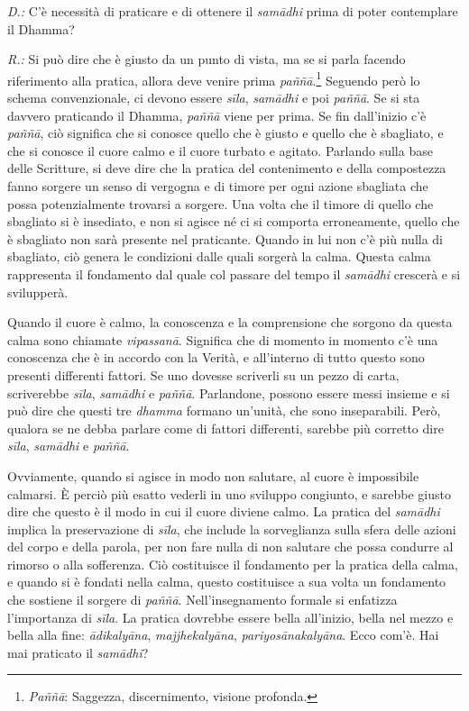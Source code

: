 \emph{D.:} C'è necessità di praticare e di ottenere il \emph{samādhi} prima di
poter contemplare il Dhamma?

\emph{R.:} Si può dire che è giusto da un punto di vista, ma se si parla
facendo riferimento alla pratica, allora deve venire prima
\emph{paññā}.\footnote{\emph{Paññā}: Saggezza, discernimento, visione
  profonda.} Seguendo però lo schema convenzionale, ci devono essere
\emph{sīla}, \emph{samādhi} e poi \emph{paññā}. Se si sta davvero
praticando il Dhamma, \emph{paññā} viene per prima. Se fin dall'inizio
c'è \emph{paññā}, ciò significa che si conosce quello che è giusto e
quello che è sbagliato, e che si conosce il cuore calmo e il cuore
turbato e agitato. Parlando sulla base delle Scritture, si deve dire che
la pratica del contenimento e della compostezza fanno sorgere un senso
di vergogna e di timore per ogni azione sbagliata che possa
potenzialmente trovarsi a sorgere. Una volta che il timore di quello che
sbagliato si è insediato, e non si agisce né ci si comporta
erroneamente, quello che è sbagliato non sarà presente nel praticante.
Quando in lui non c'è più nulla di sbagliato, ciò genera le condizioni
dalle quali sorgerà la calma. Questa calma rappresenta il fondamento dal
quale col passare del tempo il \emph{samādhi} crescerà e si svilupperà.

Quando il cuore è calmo, la conoscenza e la comprensione che sorgono da
questa calma sono chiamate \emph{vipassanā}. Significa che di momento in
momento c'è una conoscenza che è in accordo con la Verità, e all'interno
di tutto questo sono presenti differenti fattori. Se uno dovesse
scriverli su un pezzo di carta, scriverebbe \emph{sīla}, \emph{samādhi}
e \emph{paññā}. Parlandone, possono essere messi insieme e si può dire
che questi tre \emph{dhamma} formano un'unità, che sono inseparabili.
Però, qualora se ne debba parlare come di fattori differenti, sarebbe
più corretto dire \emph{sīla}, \emph{samādhi} e \emph{paññā}.

Ovviamente, quando si agisce in modo non salutare, al cuore è
impossibile calmarsi. È perciò più esatto vederli in uno sviluppo
congiunto, e sarebbe giusto dire che questo è il modo in cui il cuore
diviene calmo. La pratica del \emph{samādhi} implica la preservazione di
\emph{sīla}, che include la sorveglianza sulla sfera delle azioni del
corpo e della parola, per non fare nulla di non salutare che possa
condurre al rimorso o alla sofferenza. Ciò costituisce il fondamento per
la pratica della calma, e quando si è fondati nella calma, questo
costituisce a sua volta un fondamento che sostiene il sorgere di
\emph{paññā}. Nell'insegnamento formale si enfatizza l'importanza di
\emph{sīla}. La pratica dovrebbe essere bella all'inizio, bella nel
mezzo e bella alla fine: \emph{ādikalyāna}, \emph{majjhekalyāna},
\emph{pariyosānakalyāna}. Ecco com'è. Hai mai praticato il
\emph{samādhi}?

